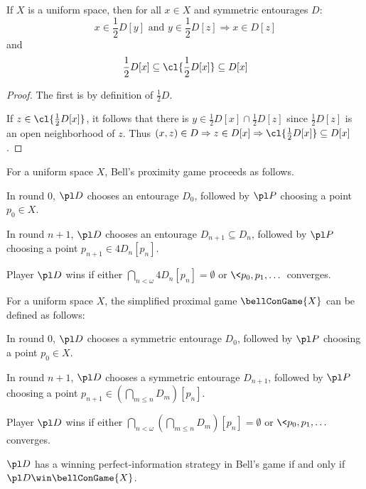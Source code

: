 \begin{prop}
  If $X$ is a uniform space, then for all $x\in X$ and symmetric entourages $D$:
    \[
      x\in \frac{1}{2}D[y]\text{ and } y\in\frac{1}{2}D[z] \Rightarrow x\in D[z]
    \]
  and
    \[
      \frac{1}{2}D[x]\subseteq \cl{\frac{1}{2}D[x]}\subseteq D[x]
    \]
\end{prop}

\begin{proof}
  The first is by definition of $\frac{1}{2}D$.

  If $z\in \cl{\frac{1}{2}D[x]}$, it follows that there is $y\in \frac{1}{2}D[x]\cap\frac{1}{2}D[z]$ since $\frac{1}{2}D[z]$ is an open neighborhood of $z$. Thus $(x,z)\in D \Rightarrow z\in D[x] \Rightarrow \cl{\frac{1}{2}D[x]}\subseteq D[x]$.
\end{proof}

\begin{defn}
  For a uniform space $X$, Bell's proximity game proceeds as follows.

  In round $0$, $\pl D$ chooses an entourage $D_0$, followed by $\pl P$ choosing a point $p_0\in X$.

  In round $n+1$, $\pl D$ chooses an entourage $D_{n+1}\subseteq D_n$, followed by $\pl P$ choosing a point $p_{n+1}\in 4D_n[p_n]$.

  Player $\pl D$ wins if either $\bigcap_{n<\omega} 4D_n[p_n] = \emptyset$ or $\<p_0,p_1,\dots\>$ converges.
\end{defn}

\begin{defn}
  For a uniform space $X$, the simplified proximal game $\bellConGame{X}$ can be defined as follows:

  In round $0$, $\pl D$ chooses a symmetric entourage $D_0$, followed by $\pl P$ choosing a point $p_0\in X$.

  In round $n+1$, $\pl D$ chooses a symmetric entourage $D_{n+1}$, followed by $\pl P$ choosing a point $p_{n+1}\in\left(\bigcap_{m\leq n}D_m\right)[p_n]$.

  Player $\pl D$ wins if either $\bigcap_{n<\omega}\left(\bigcap_{m\leq n} D_m\right)[p_n]=\emptyset$ or $\<p_0,p_1,\dots\>$ converges.
\end{defn}

\begin{thm}
  $\pl D$ has a winning perfect-information strategy in Bell's game if and only if $\pl D\win\bellConGame{X}$.
\end{thm}

